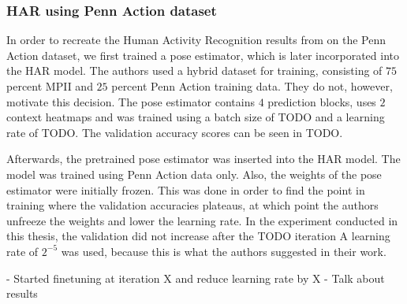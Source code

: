 \begin{table}[]
    \centering
    \caption{Our recreation in direct comparison to the original work by \cite{luvizon_2d/3d_2018}. Values represent PCKh using $\alpha = 0.5$.  } %
    \label{tab:mpii_test}
\end{table}


\subsubsection{HAR using Penn Action dataset}
In order to recreate the Human Activity Recognition results from \cite{luvizon_2d/3d_2018} on the Penn Action dataset, we first trained a pose estimator, which is later incorporated into the HAR model.
The authors used a hybrid dataset for training, consisting of $75$ percent MPII and $25$ percent Penn Action training data.
They do not, however, motivate this decision.
The pose estimator contains $4$ prediction blocks, uses $2$ context heatmaps and was trained using a batch size of TODO and a learning rate of TODO.
The validation accuracy scores can be seen in TODO.

Afterwards, the pretrained pose estimator was inserted into the HAR model.
The model was trained using Penn Action data only.
Also, the weights of the pose estimator were initially frozen.
This was done in order to find the point in training where the validation accuracies plateaus, at which point the authors unfreeze the weights and lower the learning rate.
In the experiment conducted in this thesis, the validation did not increase after the TODO iteration
A learning rate of $2^{-5}$ was used, because this is what the authors suggested in their work.

- Started finetuning at iteration X and reduce learning rate by X %
- Talk about results

